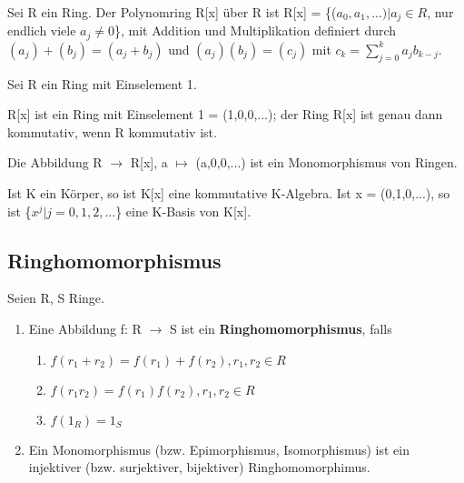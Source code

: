 \begin{definition}
Sei R ein Ring. Der Polynomring R[x] über R ist R[x] = \{($a_0,a_1,...) | a_j \in R$, nur endlich viele $a_j \neq 0$\},
mit Addition und Multiplikation definiert durch $(a_j) + (b_j) = (a_j + b_j)$ und $(a_j)(b_j) = (c_j)$ mit $c_k = \sum\nolimits_{j=0}^{k} a_j b_{k-j}$.
\end{definition}

\begin{lemma}
Sei R ein Ring mit Einselement 1.
\begin{compactenum}
\item R[x] ist ein Ring mit Einselement 1 = (1,0,0,...); der Ring R[x] ist genau dann kommutativ, wenn R kommutativ ist.
\item Die Abbildung R $\to$ R[x], a $\mapsto$ (a,0,0,...) ist ein Monomorphismus von Ringen.
\item Ist K ein Körper, so ist K[x] eine kommutative K-Algebra. Ist x = (0,1,0,...), so ist \{$x^j | j = 0,1,2,...$\} eine K-Basis von K[x].
\end{compactenum}
\end{lemma}


\subsection{Ringhomomorphismus}
\begin{definition}
Seien R, S Ringe.
\begin{enumerate}
\item Eine Abbildung f: R $\to$ S ist ein \textbf{Ringhomomorphismus}, falls
\begin{enumerate}
\item $f(r_1 +r_2) = f(r_1) + f(r_2), r_1,r_2 \in R$
\item $f(r_1r_2) = f(r_1)f(r_2), r_1,r_2 \in R$
\item $f(1_R) = 1_S$
\end{enumerate}
\item Ein Monomorphismus (bzw. Epimorphismus, Isomorphismus) ist ein injektiver (bzw. surjektiver, bijektiver) Ringhomomorphimus.
\end{enumerate}
\end{definition}


